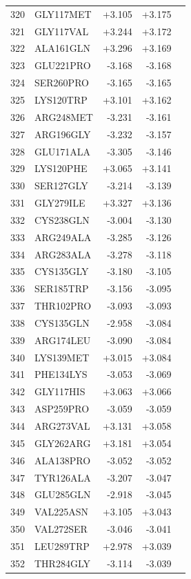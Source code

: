 \begin{longtable}{r l r r c}
320 & GLY117MET & +3.105 & +3.175 &  \\
321 & GLY117VAL & +3.244 & +3.172 &  \\
322 & ALA161GLN & +3.296 & +3.169 &  \\
323 & GLU221PRO & -3.168 & -3.168 &  \\
324 & SER260PRO & -3.165 & -3.165 &  \\
325 & LYS120TRP & +3.101 & +3.162 &  \\
326 & ARG248MET & -3.231 & -3.161 &  \\
327 & ARG196GLY & -3.232 & -3.157 &  \\
328 & GLU171ALA & -3.305 & -3.146 &  \\
329 & LYS120PHE & +3.065 & +3.141 &  \\
330 & SER127GLY & -3.214 & -3.139 &  \\
331 & GLY279ILE & +3.327 & +3.136 &  \\
332 & CYS238GLN & -3.004 & -3.130 &  \\
333 & ARG249ALA & -3.285 & -3.126 &  \\
334 & ARG283ALA & -3.278 & -3.118 &  \\
335 & CYS135GLY & -3.180 & -3.105 &  \\
336 & SER185TRP & -3.156 & -3.095 &  \\
337 & THR102PRO & -3.093 & -3.093 &  \\
338 & CYS135GLN & -2.958 & -3.084 &  \\
339 & ARG174LEU & -3.090 & -3.084 &  \\
340 & LYS139MET & +3.015 & +3.084 &  \\
341 & PHE134LYS & -3.053 & -3.069 &  \\
342 & GLY117HIS & +3.063 & +3.066 &  \\
343 & ASP259PRO & -3.059 & -3.059 &  \\
344 & ARG273VAL & +3.131 & +3.058 &  \\
345 & GLY262ARG & +3.181 & +3.054 &  \\
346 & ALA138PRO & -3.052 & -3.052 &  \\
347 & TYR126ALA & -3.207 & -3.047 &  \\
348 & GLU285GLN & -2.918 & -3.045 &  \\
349 & VAL225ASN & +3.105 & +3.043 &  \\
350 & VAL272SER & -3.046 & -3.041 &  \\
351 & LEU289TRP & +2.978 & +3.039 &  \\
352 & THR284GLY & -3.114 & -3.039 &  \\

\end{longtable}

